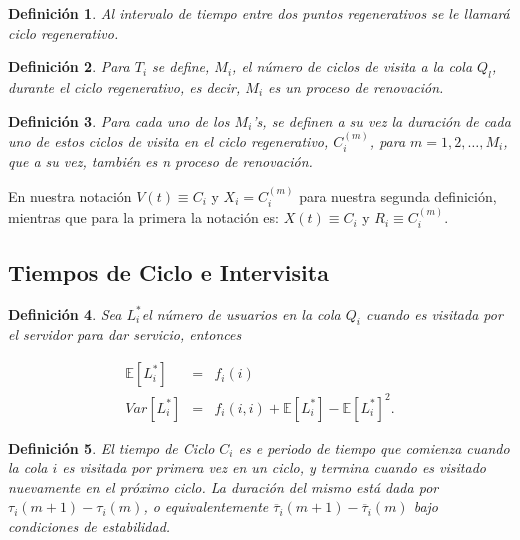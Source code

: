 \documentclass{article}
\newtheorem{Def}{Definición}
\newcommand{\esp}{\mathbb{E}}
\begin{document}
\begin{Def}
Al intervalo de tiempo entre dos puntos regenerativos se le llamar\'a ciclo regenerativo.
\end{Def}

\begin{Def}
Para $T_{i}$ se define, $M_{i}$, el n\'umero de ciclos de visita a la cola $Q_{l}$, durante el ciclo regenerativo, es decir, $M_{i}$ es un proceso de renovaci\'on.
\end{Def}

\begin{Def}
Para cada uno de los $M_{i}$'s, se definen a su vez la duraci\'on de cada uno de estos ciclos de visita en el ciclo regenerativo, $C_{i}^{(m)}$, para $m=1,2,\ldots,M_{i}$, que a su vez, tambi\'en es n proceso de renovaci\'on.
\end{Def}

En nuestra notaci\'on $V\left(t\right)\equiv C_{i}$ y $X_{i}=C_{i}^{(m)}$ para nuestra segunda definici\'on, mientras que para la primera la notaci\'on es: $X\left(t\right)\equiv C_{i}$ y $R_{i}\equiv C_{i}^{(m)}$.


\subsection{Tiempos de Ciclo e Intervisita}


\begin{Def}
Sea $L_{i}^{*}$el n\'umero de usuarios en la cola $Q_{i}$ cuando es visitada por el servidor para dar servicio, entonces

\begin{eqnarray}
\esp\left[L_{i}^{*}\right]&=&f_{i}\left(i\right)\\
Var\left[L_{i}^{*}\right]&=&f_{i}\left(i,i\right)+\esp\left[L_{i}^{*}\right]-\esp\left[L_{i}^{*}\right]^{2}.
\end{eqnarray}

\end{Def}

\begin{Def}
El tiempo de Ciclo $C_{i}$ es e periodo de tiempo que comienza cuando la cola $i$ es visitada por primera vez en un ciclo, y termina cuando es visitado nuevamente en el pr\'oximo ciclo. La duraci\'on del mismo est\'a dada por $\tau_{i}\left(m+1\right)-\tau_{i}\left(m\right)$, o equivalentemente $\overline{\tau}_{i}\left(m+1\right)-\overline{\tau}_{i}\left(m\right)$ bajo condiciones de estabilidad.
\end{Def}
\end{document}
